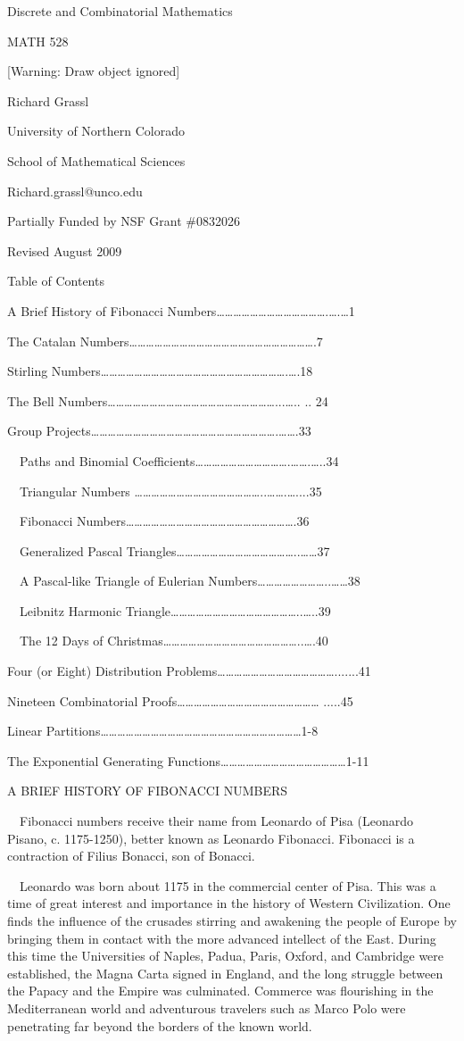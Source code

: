 \documentclass{article}
\title{}
\author{bernadette.mendozasp}
\date{2009-08-06}
\begin{document}
Discrete and Combinatorial Mathematics

MATH 528

[Warning: Draw object ignored]

Richard Grassl 

University of Northern Colorado

School of Mathematical Sciences

Richard.grassl@unco.edu

Partially Funded by NSF Grant \#0832026

Revised August 2009

Table of Contents 

A Brief History of Fibonacci Numbers………………………………….….…1

The Catalan Numbers………………………………………………………….7

Stirling Numbers………………………………………………………….….18

The Bell Numbers……………………………………………………...….. .. 24

Group Projects………………………………………………………….…….33

\ \ Paths and Binomial Coefficients…………………………….…….…..34

\ \ Triangular Numbers ………………………………………..…….…....35

\ \ Fibonacci Numbers…………………………………………………….36

\ \ Generalized Pascal Triangles……………………………………..……37

\ \ A Pascal-like Triangle of Eulerian Numbers……………………..……38

\ \ Leibnitz Harmonic Triangle………………………………………..…..39

\ \ The 12 Days of Christmas…………………………………………..….40

Four (or Eight) Distribution Problems…………………………………….......41

Nineteen Combinatorial Proofs…………………………………………… .....45

Linear Partitions………………………………………………………………1-8

The Exponential Generating Functions………………………………………1-11

A BRIEF HISTORY OF FIBONACCI NUMBERS

\ \ Fibonacci numbers receive their name from Leonardo of Pisa (Leonardo Pisano, c. 1175-1250), better known as Leonardo
Fibonacci. Fibonacci is a contraction of Filius Bonacci, son of Bonacci.

\ \ Leonardo was born about 1175 in the commercial center of Pisa. This was a time of great interest and importance in
the history of Western Civilization. One finds the influence of the crusades stirring and awakening the people of
Europe by bringing them in contact with the more advanced intellect of the East. During this time the Universities of
Naples, Padua, Paris, Oxford, and Cambridge were established, the Magna Carta signed in England, and the long struggle
between the Papacy and the Empire was culminated. Commerce was flourishing in the Mediterranean world and adventurous
travelers such as Marco Polo were penetrating far beyond the borders of the known world.
\end{document}
